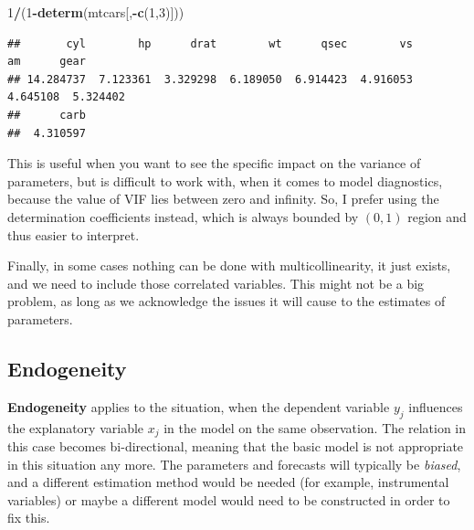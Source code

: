 \documentclass[
]{book}
\newenvironment{Shaded}{\begin{snugshade}}{\end{snugshade}}
\newcommand{\DecValTok}[1]{\textcolor[rgb]{0.00,0.00,0.81}{#1}}
\newcommand{\KeywordTok}[1]{\textcolor[rgb]{0.13,0.29,0.53}{\textbf{#1}}}
\newcommand{\NormalTok}[1]{#1}
\newcommand{\OperatorTok}[1]{\textcolor[rgb]{0.81,0.36,0.00}{\textbf{#1}}}
\theoremstyle{definition}
\theoremstyle{definition}
\theoremstyle{definition}
\theoremstyle{definition}
\theoremstyle{remark}
\begin{document}
\begin{Shaded}
\begin{Highlighting}[]
\DecValTok{1}\OperatorTok{/}\NormalTok{(}\DecValTok{1}\OperatorTok{{-}}\KeywordTok{determ}\NormalTok{(mtcars[,}\OperatorTok{{-}}\KeywordTok{c}\NormalTok{(}\DecValTok{1}\NormalTok{,}\DecValTok{3}\NormalTok{)]))}
\end{Highlighting}
\end{Shaded}

\begin{verbatim}
##       cyl        hp      drat        wt      qsec        vs        am      gear 
## 14.284737  7.123361  3.329298  6.189050  6.914423  4.916053  4.645108  5.324402 
##      carb 
##  4.310597
\end{verbatim}

This is useful when you want to see the specific impact on the variance of parameters, but is difficult to work with, when it comes to model diagnostics, because the value of VIF lies between zero and infinity. So, I prefer using the determination coefficients instead, which is always bounded by \((0, 1)\) region and thus easier to interpret.

Finally, in some cases nothing can be done with multicollinearity, it just exists, and we need to include those correlated variables. This might not be a big problem, as long as we acknowledge the issues it will cause to the estimates of parameters.

\hypertarget{assumptionsXregEndogeneity}{%
\subsection{Endogeneity}\label{assumptionsXregEndogeneity}}

\textbf{Endogeneity} applies to the situation, when the dependent variable \(y_j\) influences the explanatory variable \(x_j\) in the model on the same observation. The relation in this case becomes bi-directional, meaning that the basic model is not appropriate in this situation any more. The parameters and forecasts will typically be \emph{biased}, and a different estimation method would be needed (for example, instrumental variables) or maybe a different model would need to be constructed in order to fix this.
\end{document}
